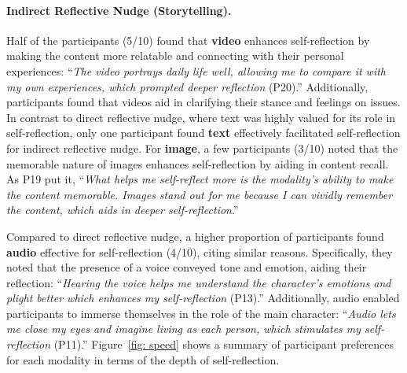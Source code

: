 \paragraph{Indirect Reflective Nudge (Storytelling).} Half of the participants (5/10) found that \textbf{video} enhances self-reflection by making the content more relatable and connecting with their personal experiences: ``\textit{The video portrays daily life well, allowing me to compare it with my own experiences, which prompted deeper reflection} (P20).'' Additionally, participants found that videos aid in clarifying their stance and feelings on issues.
In contrast to direct reflective nudge, where text was highly valued for its role in self-reflection, only one participant found \textbf{text} effectively facilitated self-reflection for indirect reflective nudge. %
For \textbf{image}, a few participants (3/10) noted that the memorable nature of images enhances self-reflection by aiding in content recall. As P19 put it, ``\textit{What helps me self-reflect more is the modality’s ability to make the content memorable. Images stand out for me because I can vividly remember the content, which aids in deeper self-reflection}.''

Compared to direct reflective nudge, a higher proportion of participants found \textbf{audio} effective for self-reflection (4/10), citing similar reasons. Specifically, they noted that the presence of a voice conveyed tone and emotion, aiding their reflection: ``\textit{Hearing the voice helps me understand the character’s emotions and plight better which enhances my self-reflection} (P13).'' 
Additionally, audio enabled participants to immerse themselves in the role of the main character: ``\textit{Audio lets me close my eyes and imagine living as each person, which stimulates my self-reflection} (P11).'' Figure~\ref{fig: speed} shows a summary of participant preferences for each modality in terms of the depth of self-reflection.

